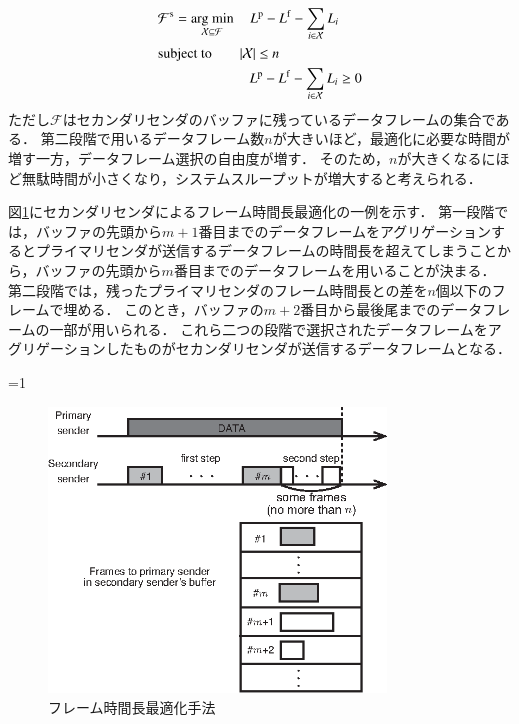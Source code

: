 \documentclass[master]{kuisthesis}		%
\newcommand{\argmin}{\mathop{\rm arg~min}\limits}
\newcounter{flagFig}
\begin{document}
		\begin{align}
			&{\mathcal F}^{\rm s} = \argmin_{{\mathcal X} \subseteq {\mathcal F}}\quad L^{\rm p} - L^{\rm f} - \sum_{i \in {\mathcal X}}L_{i} \\
			&{\rm subject \ to} \qquad |{\mathcal X}| \leq n \\
			&\;\;\qquad\qquad\qquad L^{\rm p} - L^{\rm f} - \sum_{i \in {\mathcal X}} L_{i} \geq 0
		\end{align}
		ただし${\mathcal F}$はセカンダリセンダのバッファに残っているデータフレームの集合である．
		第二段階で用いるデータフレーム数$n$が大きいほど，最適化に必要な時間が増す一方，データフレーム選択の自由度が増す．
		そのため，$n$が大きくなるにほど無駄時間が小さくなり，システムスループットが増大すると考えられる．
		\par
		図\ref{fig:opti}にセカンダリセンダによるフレーム時間長最適化の一例を示す．
		第一段階では，バッファの先頭から$m+1$番目までのデータフレームをアグリゲーションするとプライマリセンダが送信するデータフレームの時間長を超えてしまうことから，バッファの先頭から$m$番目までのデータフレームを用いることが決まる．
		第二段階では，残ったプライマリセンダのフレーム時間長との差を$n$個以下のフレームで埋める．
		このとき，バッファの$m+2$番目から最後尾までのデータフレームの一部が用いられる．
		これら二つの段階で選択されたデータフレームをアグリゲーションしたものがセカンダリセンダが送信するデータフレームとなる．
		\par

		\ifnum\value{flagFig}=1 {\begin{figure}[htbp]
			\begin{center}
				\includegraphics[width=0.8\textwidth]{fig/opti.eps}
				\caption{フレーム時間長最適化手法}
				\label{fig:opti}
			\end{center}
		\end{figure}}\fi
\end{document}
